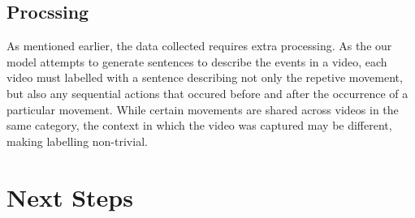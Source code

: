 \documentclass[11pt]{article}
\begin{document}
\subsection{Procssing}
As mentioned earlier, the data collected requires extra processing. As the our model attempts to generate sentences to describe
the events in a video, each video must labelled with a sentence describing not only the repetive movement, but also
any sequential actions that occured before and after the occurrence of a particular movement. While certain movements are shared
across videos in the same category, the context in which the video was captured may be different, making labelling non-trivial.

\section{Next Steps}
\end{document}
